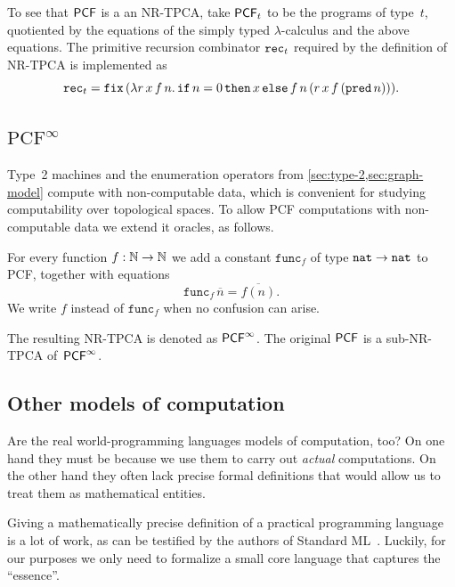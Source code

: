 To see that $\mathsf{PCF}$ is a an NR-TPCA, take $\mathsf{PCF}_t$ to be the programs of
type~$t$, quotiented by the equations of the simply typed $\lambda$-calculus and the above equations.
%
The primitive recursion combinator $\mathtt{rec}_t$ required by the definition of NR-TPCA is implemented as
%
\begin{equation*}  
  \mathtt{rec}_t =
  \mathtt{fix} \,
  (\lambda r\,x\,f\,n .\,\mathtt{if}\,n = 0\,\mathtt{then}\,x\,\mathtt{else}\,f\,n\,(r \, x\, f \, (\mathtt{pred}\, n))).
\end{equation*}

\subsection[\texorpdfstring{$\text{PCF}^\infty$}{PCF-infinity}]{$\text{PCF}^\infty$}

Type~2 machines and the enumeration operators from \cref{sec:type-2,sec:graph-model}
compute with non-computable data, which is convenient for studying computability over topological spaces. To allow PCF computations with non-computable data we extend it oracles, as follows.

For every function $f : \mathbb{N} \to \mathbb{N}$ we add a constant $\mathtt{func}_f$
of type $\mathtt{nat} \to \mathtt{nat}$ to PCF, together with equations
%
\begin{equation*}
  \mathtt{func}_f \, \overline{n} = \overline{f(n)}.
\end{equation*}
%
We write $f$ instead of $\mathtt{func}_f$ when no confusion can arise.

The resulting NR-TPCA is denoted as $\mathsf{PCF}^\infty$. The original $\mathsf{PCF}$ is a sub-NR-TPCA of~$\mathsf{PCF}^\infty$.

\subsection{Other models of computation}
\label{sec:other-models}

Are the real world-programming languages models of computation, too? On one hand they must be because we use them to carry out \emph{actual} computations. On the other hand they often lack precise formal definitions that would allow us to treat them as mathematical entities.

Giving a mathematically precise definition of a practical programming language is a lot of work, as can be testified by the authors of Standard ML~. Luckily, for our purposes we only need to formalize a small core language that captures the ``essence''.

